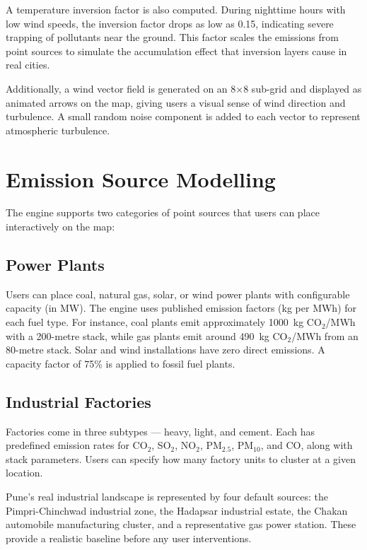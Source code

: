 \documentclass[a4paper, 12pt]{report}
\begin{document}
A temperature inversion factor is also computed. During nighttime hours with low wind speeds, the inversion factor drops as low as 0.15, indicating severe trapping of pollutants near the ground. This factor scales the emissions from point sources to simulate the accumulation effect that inversion layers cause in real cities.

Additionally, a wind vector field is generated on an 8$\times$8 sub-grid and displayed as animated arrows on the map, giving users a visual sense of wind direction and turbulence. A small random noise component is added to each vector to represent atmospheric turbulence.

\section{Emission Source Modelling}
The engine supports two categories of point sources that users can place interactively on the map:

\subsection{Power Plants}
Users can place coal, natural gas, solar, or wind power plants with configurable capacity (in MW). The engine uses published emission factors (kg per MWh) for each fuel type. For instance, coal plants emit approximately 1000~kg CO$_2$/MWh with a 200-metre stack, while gas plants emit around 490~kg CO$_2$/MWh from an 80-metre stack. Solar and wind installations have zero direct emissions. A capacity factor of 75\% is applied to fossil fuel plants.

\subsection{Industrial Factories}
Factories come in three subtypes --- heavy, light, and cement. Each has predefined emission rates for CO$_2$, SO$_2$, NO$_2$, PM$_{2.5}$, PM$_{10}$, and CO, along with stack parameters. Users can specify how many factory units to cluster at a given location.

Pune's real industrial landscape is represented by four default sources: the Pimpri-Chinchwad industrial zone, the Hadapsar industrial estate, the Chakan automobile manufacturing cluster, and a representative gas power station. These provide a realistic baseline before any user interventions.

\end{document}
